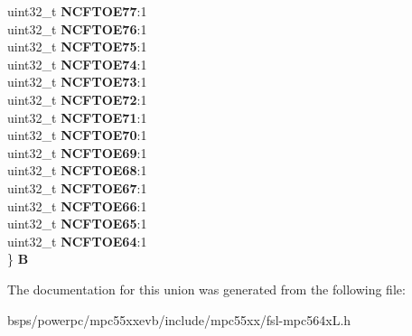 \begin{DoxyCompactItemize}
\begin{tabbing}
\>uint32\_t {\bfseries NCFTOE77}:1\\
\>uint32\_t {\bfseries NCFTOE76}:1\\
\>uint32\_t {\bfseries NCFTOE75}:1\\
\>uint32\_t {\bfseries NCFTOE74}:1\\
\>uint32\_t {\bfseries NCFTOE73}:1\\
\>uint32\_t {\bfseries NCFTOE72}:1\\
\>uint32\_t {\bfseries NCFTOE71}:1\\
\>uint32\_t {\bfseries NCFTOE70}:1\\
\>uint32\_t {\bfseries NCFTOE69}:1\\
\>uint32\_t {\bfseries NCFTOE68}:1\\
\>uint32\_t {\bfseries NCFTOE67}:1\\
\>uint32\_t {\bfseries NCFTOE66}:1\\
\>uint32\_t {\bfseries NCFTOE65}:1\\
\>uint32\_t {\bfseries NCFTOE64}:1\\
\} {\bfseries B}\\

\end{tabbing}\end{DoxyCompactItemize}


The documentation for this union was generated from the following file\+:\begin{DoxyCompactItemize}
\item 
bsps/powerpc/mpc55xxevb/include/mpc55xx/fsl-\/mpc564x\+L.\+h\end{DoxyCompactItemize}
